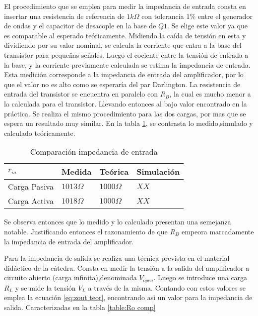 El procedimiento que se emplea para medir la impedancia de entrada consta en insertar una resistencia de referencia de $1 k\Omega$ con tolerancia $1\%$ entre el generador de ondas y el capacitor de desacople en la base de $Q1$. Se elige este valor ya que es comparable al esperado teóricamente.
Midiendo la caída de tensión en esta y dividiendo por su valor nominal, se calcula la corriente que entra a la base del transistor para pequeñas señales. Luego el cociente entre la tensión de entrada a la base, y la corriente previamente calculada se estima la impedancia de entrada. Esta medición corresponde a la impedancia de entrada del amplificador, por lo que el valor no es alto como se esperaría del par Darlington.
La resistencia de entrada del transistor se encuentra en paralelo con $R_B$, la cual es mucho menor a la calculada para el transistor. Llevando entonces al bajo valor encontrado en la práctica.
Se realiza el mismo procedimiento para las dos cargas, por mas que se espera un resultado muy similar. En la tabla \ref{table:Ri comp}, se contrasta lo medido,simulado y calculado teóricamente.

\begin{table}[ht]
    \centering
    \begin{tabular}{|l|l|l|l|}
    \hline
    $r_{ia}$     & Medida       & Teórica         & Simulación \\ \hline
    Carga Pasiva & $1013\Omega$ & $1000\Omega $   &  $XX $          \\ \hline
    Carga Activa & $1018\Omega$ & $1000\Omega $  &  $XX $          \\ \hline
    \end{tabular}
    \caption{Comparación impedancia de entrada}\label{table:Ri comp}
\end{table}

Se observa entonces que lo medido y lo calculado presentan una semejanza notable. Justificando entonces el razonamiento de que $R_B$ empeora marcadamente la impedancia de entrada del amplificador.

Para la impedancia de salida se realiza una técnica prevista en el material didáctico de la cátedra. Consta en medir la tensión a la salida del amplificador a circuito abierto (carga infinita),denominada $V_{open}$. Luego se introduce una carga $R_L$ y se mide la tensión $V_L$ a través de la misma.
Contando con estos valores se emplea la ecuación \ref{eq:zout teor}, encontrando asi un valor para la impedancia de salida. Caracterizadas en la tabla \ref{table:Ro comp}

